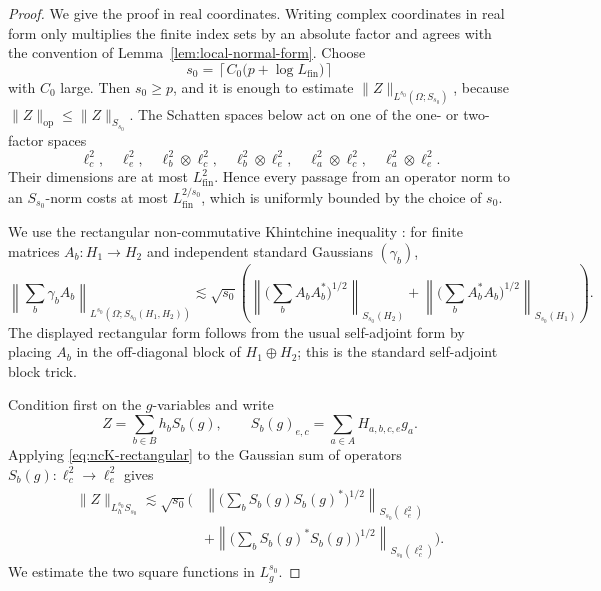\documentclass[11pt,reqno]{amsart}
\numberwithin{equation}{section}
\theoremstyle{plain}
\theoremstyle{definition}
\newcommand{\op}{\operatorname{op}}
\newcommand{\Lfin}{L_{\mathrm{fin}}}
\begin{document}
\begin{proof}
We give the proof in real coordinates.  Writing complex coordinates in real form only multiplies the finite index sets by an absolute factor and agrees with the convention of Lemma~\ref{lem:local-normal-form}.  Choose
\[
        s_0=\left\lceil C_0\bigl(p+\log\Lfin\bigr)\right\rceil
\]
with \(C_0\) large.  Then \(s_0\ge p\), and it is enough to estimate
\(\|Z\|_{L^{s_0}(\Omega;S_{s_0})}\), because
\(\|Z\|_{\op}\le \|Z\|_{S_{s_0}}\).  The Schatten spaces below act on one of the one- or two-factor spaces
\[
        \ell^2_c,
        \quad \ell^2_e,
        \quad \ell^2_b\otimes\ell^2_c,
        \quad \ell^2_b\otimes\ell^2_e,
        \quad \ell^2_a\otimes\ell^2_c,
        \quad \ell^2_a\otimes\ell^2_e .
\]
Their dimensions are at most \(\Lfin^2\).  Hence every passage from an operator norm to an \(S_{s_0}\)-norm costs at most \(\Lfin^{2/s_0}\), which is uniformly bounded by the choice of \(s_0\).

We use the rectangular non-commutative Khintchine inequality \cite{LustPisier}: for finite matrices \(A_b:H_1\to H_2\) and independent standard Gaussians \((\gamma_b)\),
\begin{equation}\label{eq:ncK-rectangular}
\left\|\sum_b\gamma_bA_b\right\|_{L^{s_0}(\Omega;S_{s_0}(H_1,H_2))}
\lesssim \sqrt {s_0}\left(
\left\|\Big(\sum_bA_bA_b^*\Big)^{1/2}\right\|_{S_{s_0}(H_2)}
+
\left\|\Big(\sum_bA_b^*A_b\Big)^{1/2}\right\|_{S_{s_0}(H_1)}
\right).
\end{equation}
The displayed rectangular form follows from the usual self-adjoint form by placing \(A_b\) in the off-diagonal block of \(H_1\oplus H_2\); this is the standard self-adjoint block trick.

Condition first on the \(g\)-variables and write
\begin{equation}\label{eq:tensor-condition-h}
        Z=\sum_{b\in B}h_bS_b(g),
        \qquad
        S_b(g)_{e,c}=\sum_{a\in A}H_{a,b,c,e}g_a .
\end{equation}
Applying \eqref{eq:ncK-rectangular} to the Gaussian sum of operators \(S_b(g):\ell^2_c\to\ell^2_e\) gives
\begin{equation}\label{eq:ncK-first-strict}
\begin{aligned}
        \|Z\|_{L_h^{s_0}S_{s_0}}
        \lesssim \sqrt {s_0}\Bigg(&
        \left\|\Big(\sum_b S_b(g)S_b(g)^*\Big)^{1/2}\right\|_{S_{s_0}(\ell^2_e)}\\
        &+
        \left\|\Big(\sum_b S_b(g)^*S_b(g)\Big)^{1/2}\right\|_{S_{s_0}(\ell^2_c)}\Bigg).
\end{aligned}
\end{equation}
We estimate the two square functions in \(L_g^{s_0}\).


\end{proof}
\end{document}
